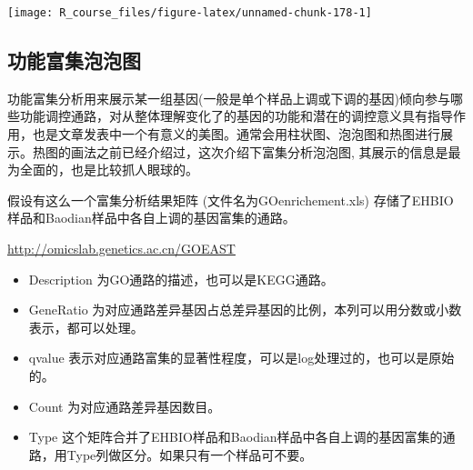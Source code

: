 \documentclass[]{article}
\providecommand{\tightlist}{%
  \setlength{\itemsep}{0pt}\setlength{\parskip}{0pt}}
\numberwithin{figure}{section}
\numberwithin{table}{section}
\theoremstyle{definition}
\theoremstyle{definition}
\theoremstyle{definition}
\theoremstyle{remark}
\begin{document}
\begin{center}\texttt{[image: R\_course\_files/figure-latex/unnamed-chunk-178-1]} \end{center}

\subsection{功能富集泡泡图}

功能富集分析用来展示某一组基因(一般是单个样品上调或下调的基因)倾向参与哪些功能调控通路，对从整体理解变化了的基因的功能和潜在的调控意义具有指导作用，也是文章发表中一个有意义的美图。通常会用柱状图、泡泡图和热图进行展示。热图的画法之前已经介绍过，这次介绍下富集分析泡泡图,
其展示的信息是最为全面的，也是比较抓人眼球的。

假设有这么一个富集分析结果矩阵 (文件名为GOenrichement.xls)
存储了EHBIO样品和Baodian样品中各自上调的基因富集的通路。

\url{http://omicslab.genetics.ac.cn/GOEAST}

\begin{itemize}
\tightlist
\item
  Description 为GO通路的描述，也可以是KEGG通路。
\item
  GeneRatio
  为对应通路差异基因占总差异基因的比例，本列可以用分数或小数表示，都可以处理。
\item
  qvalue
  表示对应通路富集的显著性程度，可以是log处理过的，也可以是原始的。
\item
  Count 为对应通路差异基因数目。
\item
  Type
  这个矩阵合并了EHBIO样品和Baodian样品中各自上调的基因富集的通路，用Type列做区分。如果只有一个样品可不要。
\end{itemize}
\end{document}
